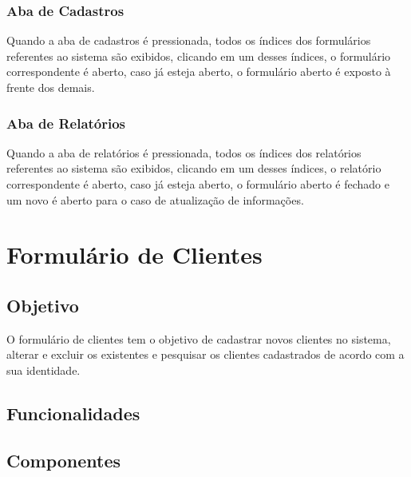 \documentclass[12pt, a4paper,  article, brazil]{abntex2}
\begin{document}
		\subsubsection{Aba de Cadastros}
		Quando a aba de cadastros é pressionada, todos os índices dos formulários referentes ao sistema são exibidos, clicando em um desses índices, o formulário correspondente é aberto, caso já esteja aberto, o formulário aberto é exposto à frente dos demais.
		\subsubsection{Aba de Relatórios}
		Quando a aba de relatórios é pressionada, todos os índices dos relatórios referentes ao sistema são exibidos, clicando em um desses índices, o relatório correspondente é aberto, caso já esteja aberto, o formulário aberto é fechado e um novo é aberto para o caso de atualização de informações.
	\newpage
	\section{Formulário de Clientes}
		\subsection{Objetivo}
		O formulário de clientes tem o objetivo de cadastrar novos clientes no sistema, alterar e excluir os existentes e pesquisar os clientes cadastrados de acordo com a sua identidade.
		\subsection{Funcionalidades}	
		\subsection{Componentes}
\end{document}
